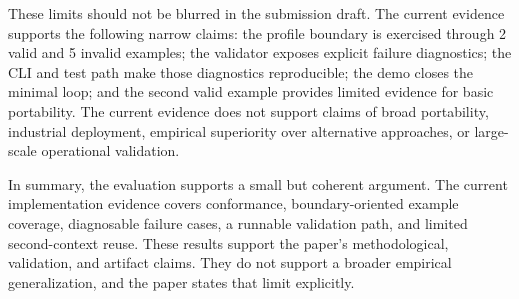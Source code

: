 These limits should not be blurred in the submission draft. The current evidence supports the following narrow claims: the profile boundary is exercised through 2 valid and 5 invalid examples; the validator exposes explicit failure diagnostics; the CLI and test path make those diagnostics reproducible; the demo closes the minimal loop; and the second valid example provides limited evidence for basic portability. The current evidence does not support claims of broad portability, industrial deployment, empirical superiority over alternative approaches, or large-scale operational validation.

In summary, the evaluation supports a small but coherent argument. The current implementation evidence covers conformance, boundary-oriented example coverage, diagnosable failure cases, a runnable validation path, and limited second-context reuse. These results support the paper's methodological, validation, and artifact claims. They do not support a broader empirical generalization, and the paper states that limit explicitly.
